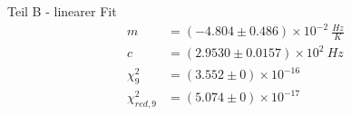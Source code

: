 {\LARGE Teil B - linearer Fit}
\begin{align*}
	m &= \left(-4.804 \pm 0.486\right) \times 10^{-2}\ \frac{Hz}{K}\\
	c &= \left(2.9530 \pm 0.0157\right) \times 10^{2}\ Hz\\
	\chi^2_{9} &= \left(3.552 \pm 0\right) \times 10^{-16}\ \\
	\chi^2_{red,9} &= \left(5.074 \pm 0\right) \times 10^{-17}\ \\
\end{align*}